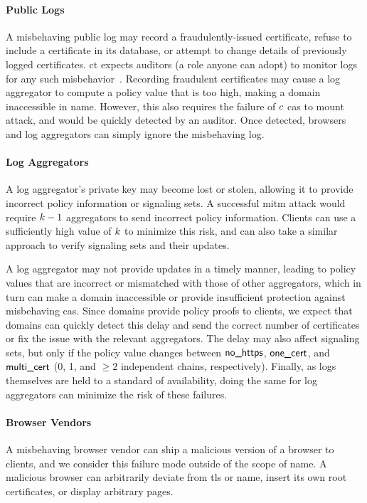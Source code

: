 \paragraph{Public Logs}
A misbehaving public log may record a fraudulently-issued certificate, refuse
to include a certificate in its database, or attempt to change details of
previously logged certificates. \ac{ct} expects auditors (a role anyone can adopt) to
monitor logs for any such misbehavior~\cite{rfc6962}. 
Recording fraudulent certificates may cause a log
aggregator to compute a policy value that is too high, making a domain
inaccessible in \ac{name}. However, this also requires the failure of $c$
\acp{ca} to mount  attack, and would be quickly detected by an
auditor. Once detected, browsers and log aggregators can simply ignore the
misbehaving log.

\paragraph{Log Aggregators}
A log aggregator's private key may become lost or stolen, allowing it to
provide incorrect policy information or signaling sets. A successful \ac{mitm}
attack would require $k - 1$ aggregators to send incorrect policy
information. Clients can use a sufficiently high value of $k$ to minimize
this risk, and can also take a similar approach to verify signaling sets and
their updates.

A log aggregator may not provide updates in a timely manner, leading to policy
values that are incorrect or mismatched with those of other aggregators, which
in turn can make a domain inaccessible or provide insufficient protection
against misbehaving \acp{ca}. Since domains provide policy proofs to clients,
we expect that domains can quickly detect this delay and send the correct
number of certificates or fix the issue with the relevant aggregators. The
delay may also affect signaling sets, but only if the policy value changes
between $\textsf{no\_https}$, $\textsf{one\_cert}$, and $\textsf{multi\_cert}$ (0, 1, and $\ge 2$ independent
chains, respectively). Finally, as logs themselves are held to a standard of
availability, doing the same for log aggregators can minimize the risk of these
failures.

\paragraph{Browser Vendors}
A misbehaving browser vendor can ship a malicious version of a browser to
clients, and we consider this failure mode outside of the scope of \ac{name}. A
malicious browser can arbitrarily deviate from \ac{tls} or \ac{name}, insert
its own root certificates, or display arbitrary pages. 

